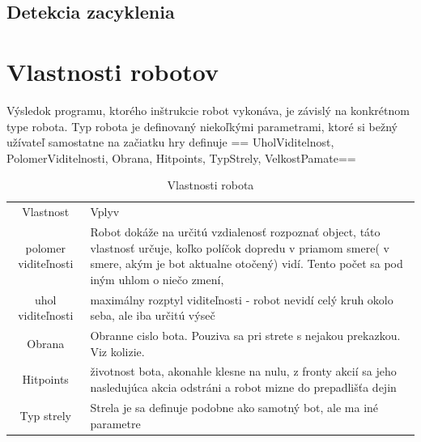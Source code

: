 \subsection{Detekcia zacyklenia}

\section{Vlastnosti robotov}
Výsledok programu, ktorého inštrukcie robot vykonáva, je závislý na konkrétnom type robota. Typ robota je definovaný niekoľkými parametrami, ktoré si bežný užívateľ samostatne na začiatku hry definuje == UholViditelnost, PolomerViditelnosti, Obrana, Hitpoints, TypStrely, VelkostPamate==
\begin{table}[ht]
\caption{Vlastnosti robota}   %
\centering                          %
\begin{tabular}{cl}            %
Vlastnost & Vplyv \\   %
polomer viditeľnosti & Robot dokáže na určitú vzdialenosť rozpoznať object, táto vlastnosť určuje, koľko políčok dopredu v priamom smere( v smere, akým je bot aktualne otočený) vidí. Tento počet sa pod iným uhlom o niečo zmení,\\
uhol viditeľnosti & maximálny rozptyl viditeľnosti - robot nevidí celý kruh okolo seba, ale iba určitú výseč \\
Obrana & Obranne cislo bota. Pouziva sa pri strete s nejakou prekazkou. Viz kolizie. \\
Hitpoints  & životnost bota, akonahle klesne na nulu, z fronty akcií sa jeho nasledujúca akcia odstráni a robot mizne do prepadlišťa dejin\\
Typ strely & Strela je sa definuje podobne ako samotný bot, ale ma iné parametre\\
\end{tabular}
\label{table:vlastnosti}          %
\end{table}

